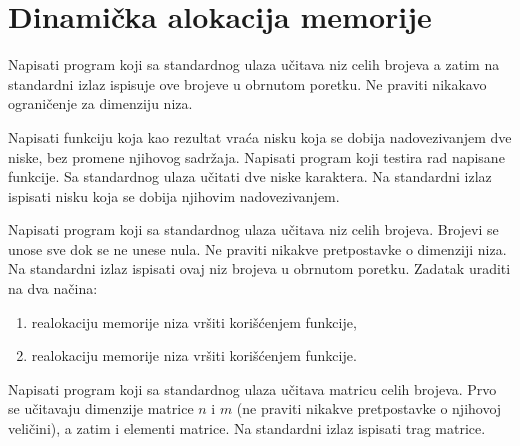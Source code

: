 \section{Dinamička alokacija memorije}

\begin{Exercise}[label=328]
Napisati program koji sa standardnog ulaza učitava niz celih
brojeva a zatim na standardni izlaz ispisuje ove brojeve u
obrnutom poretku. Ne praviti nikakavo ograničenje za dimenziju
niza.
\end{Exercise}
\begin{Answer}[ref=328]
\end{Answer}

\begin{Exercise}[label=329]
Napisati funkciju koja kao rezultat vraća nisku koja se dobija
nadovezivanjem dve niske, bez promene njihovog sadržaja.
Napisati program koji testira rad napisane funkcije. Sa
standardnog ulaza učitati dve niske karaktera. Na standardni
izlaz ispisati nisku koja se dobija njihovim nadovezivanjem.
\end{Exercise}
\begin{Answer}[ref=329]
\end{Answer}

\begin{Exercise}[label=330]
Napisati program koji sa standardnog ulaza učitava niz celih
brojeva. Brojevi se unose sve dok se ne unese nula. Ne praviti
nikakve pretpostavke o dimenziji niza. Na standardni izlaz
ispisati ovaj niz brojeva u obrnutom poretku. Zadatak uraditi na dva načina:
\begin{enumerate}
\item realokaciju memorije niza vršiti korišćenjem  funkcije,
\item realokaciju memorije niza vršiti korišćenjem  funkcije.
\end{enumerate}
\end{Exercise}
\begin{Answer}[ref=330]
\end{Answer}

\begin{Exercise}[label=331]
Napisati program koji sa standardnog ulaza učitava matricu
celih brojeva. Prvo se učitavaju dimenzije matrice $n$ i
$m$ (ne praviti nikakve pretpostavke o njihovoj veličini),
a zatim i elementi matrice. Na standardni izlaz ispisati trag
matrice.
\end{Exercise}
\begin{Answer}[ref=331]
\end{Answer}


